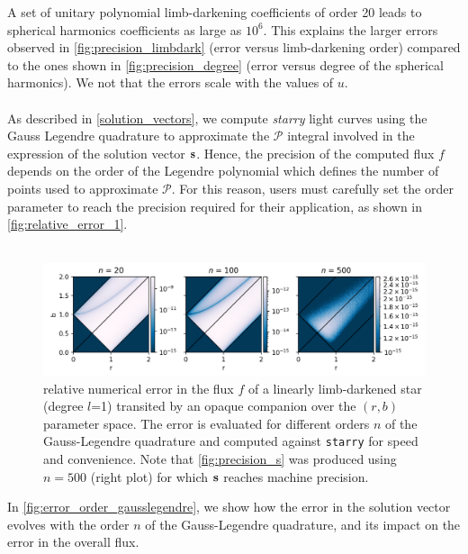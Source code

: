 \documentclass[modern]{aastex631}
\begin{document}
A set of unitary polynomial limb-darkening coefficients of order 20 leads to spherical harmonics coefficients as large as $10^6$. This explains the larger errors observed in \autoref{fig:precision_limbdark} (error versus limb-darkening order) compared to the ones shown in \autoref{fig:precision_degree} (error versus degree of the spherical harmonics). We not that the errors scale with the values of $u$.\\\\
As described in \autoref{solution_vectors}, we compute \textit{starry} light curves using the Gauss Legendre quadrature to approximate the $\mathcal{P}$ integral involved in the expression of the solution vector ${\mathbf{s}}$. Hence, the precision of the computed flux $f$ depends on the order of the Legendre polynomial which defines the number of points used to approximate $\mathcal{P}$. For this reason, users must carefully set the order parameter to reach the precision required for their application, as shown in \autoref{fig:relative_error_1}.\\\\
\begin{figure}[H]
    \begin{center}
        \includegraphics[width=\textwidth]{../workflows/precision/figures/br_error.png}
        \caption{relative numerical error in the flux $f$ of a linearly limb-darkened star (degree $l$=1) transited by an opaque companion over the $(r, b)$ parameter space. The error is evaluated for different orders $n$ of the Gauss-Legendre quadrature and computed against \texttt{starry} for speed and convenience. Note that \autoref{fig:precision_s} was produced using $n=500$ (right plot) for which ${\mathbf{s}}$ reaches machine precision. }
        \label{fig:relative_error_1}
    \end{center}
\end{figure}
In \autoref{fig:error_order_gausslegendre}, we show how the error in the solution vector evolves with the order $n$ of the Gauss-Legendre quadrature, and its impact on the error in the overall flux.
\end{document}
